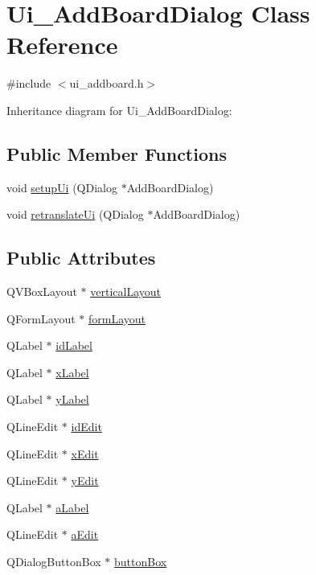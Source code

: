 \hypertarget{class_ui___add_board_dialog}{}\section{Ui\+\_\+\+Add\+Board\+Dialog Class Reference}
\label{class_ui___add_board_dialog}


{\ttfamily \#include $<$ui\+\_\+addboard.\+h$>$}



Inheritance diagram for Ui\+\_\+\+Add\+Board\+Dialog\+:
\subsection*{Public Member Functions}
\begin{DoxyCompactItemize}
\item 
void \hyperlink{class_ui___add_board_dialog_a2b3833f77e237c70e3697ec86b307dc7}{setup\+Ui} (Q\+Dialog $\ast$Add\+Board\+Dialog)
\item 
void \hyperlink{class_ui___add_board_dialog_a3b4c1a68258b60e143be72111d0cfdf0}{retranslate\+Ui} (Q\+Dialog $\ast$Add\+Board\+Dialog)
\end{DoxyCompactItemize}
\subsection*{Public Attributes}
\begin{DoxyCompactItemize}
\item 
Q\+V\+Box\+Layout $\ast$ \hyperlink{class_ui___add_board_dialog_a8919b3594f9088f01706c8681c772f1d}{vertical\+Layout}
\item 
Q\+Form\+Layout $\ast$ \hyperlink{class_ui___add_board_dialog_ad5e2b0ea40c7fe81d6d352cd712d7881}{form\+Layout}
\item 
Q\+Label $\ast$ \hyperlink{class_ui___add_board_dialog_a260636c9ab19faf5e1a7b9bf3cc9d103}{id\+Label}
\item 
Q\+Label $\ast$ \hyperlink{class_ui___add_board_dialog_a46c3c482c1766e206b64ae88e5bafc31}{x\+Label}
\item 
Q\+Label $\ast$ \hyperlink{class_ui___add_board_dialog_af24ba730b7cb63f6fd7240634d7d4d32}{y\+Label}
\item 
Q\+Line\+Edit $\ast$ \hyperlink{class_ui___add_board_dialog_a3e9f9272b3f56f20190d90fafba65e43}{id\+Edit}
\item 
Q\+Line\+Edit $\ast$ \hyperlink{class_ui___add_board_dialog_a0ab2c4065059bed205408b7db0158301}{x\+Edit}
\item 
Q\+Line\+Edit $\ast$ \hyperlink{class_ui___add_board_dialog_a293ea53c69dfd36892d95f72ccd373c9}{y\+Edit}
\item 
Q\+Label $\ast$ \hyperlink{class_ui___add_board_dialog_a944e38a75349d9ca10186543da543c99}{a\+Label}
\item 
Q\+Line\+Edit $\ast$ \hyperlink{class_ui___add_board_dialog_a599da5f59aee3811eb1683c4ca1b9a4c}{a\+Edit}
\item 
Q\+Dialog\+Button\+Box $\ast$ \hyperlink{class_ui___add_board_dialog_ad3ff0b750dddf6e2a2ae0ab2e2a62ffd}{button\+Box}
\end{DoxyCompactItemize}


